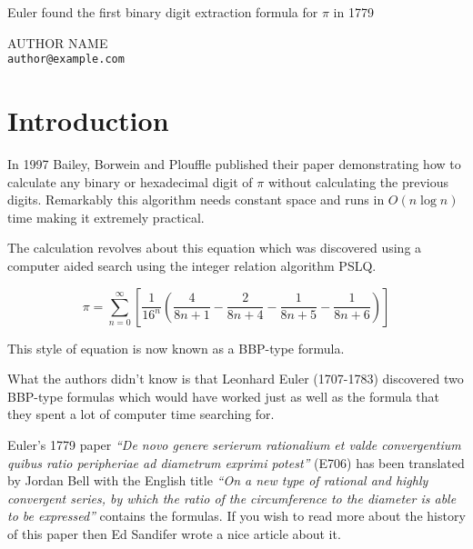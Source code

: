 \documentclass[11pt]{article}
\begin{document}
\begin{center}
{\LARGE Euler found the first binary digit extraction formula for $\pi$ in 1779} \\

\bigskip\bigskip

{AUTHOR NAME \\ {\tt author@example.com}}

\end{center}

\medskip

\begin{abstract}\noindent
In 1779 Euler discovered two formulas for $\pi$ which can be used to calculate any binary digit of $\pi$ without calculating the previous digits. Up until now it was believed that the first formula with the correct properties (known as a BBP-type formula) for this calculation was published by Bailey, Borwein and Plouffle in 1997.
\end{abstract}

\medskip

\section{Introduction}

In 1997 Bailey, Borwein and Plouffle published their paper \cite{BBP} demonstrating how to calculate any binary or hexadecimal digit of $\pi$ without calculating the previous digits. Remarkably this algorithm needs constant space and runs in $O(n \log{n})$ time making it extremely practical.

The calculation revolves about this equation which was discovered using a computer aided search using the integer relation algorithm PSLQ.

\begin{equation}   \label{eq:originalbbp}
  \pi = \sum_{n = 0}^\infty \left[ \frac{1}{16^n} \left( \frac{4}{8n + 1} - \frac{2}{8n + 4} - \frac{1}{8n + 5} - \frac{1}{8n + 6} \right) \right]
\end{equation}

This style of equation is now known as a BBP-type formula.

What the authors didn't know is that Leonhard Euler (1707-1783) discovered two BBP-type formulas which would have worked just as well as the formula that they spent a lot of computer time searching for.

Euler's 1779 paper \emph{``De novo genere serierum rationalium et valde convergentium quibus ratio peripheriae ad diametrum exprimi potest''} \cite{E706latin} (E706) 
has been translated by Jordan Bell with the English title \emph{``On a new type of rational and highly convergent series, by which the ratio of the circumference to the diameter is able to be expressed''} \cite{E706en} contains the formulas. If you wish to read more about the history of this paper then Ed Sandifer \cite{Sandifer} wrote a nice article about it.
\end{document}
